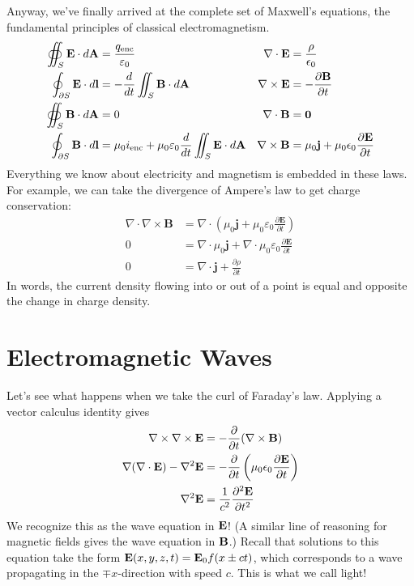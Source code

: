 \documentclass[../p051main.tex]{subfiles}
\begin{document}
Anyway, we've finally arrived at the complete set of Maxwell's equations, the fundamental principles of classical electromagnetism.
\begin{align*}
    \oiint_S \mathbf{E} \cdot d\mathbf{A} &= \frac{q_\text{enc}}{\varepsilon_0} & \nabla \cdot \mathbf{E} &= \frac{\rho}{\epsilon_0} \\
    \oint_{\partial S} \mathbf{E} \cdot d\mathbf{l} &= -\frac{d}{dt} \iint_S \mathbf{B} \cdot d\mathbf{A} & \nabla \times \mathbf{E} &= -\frac{\partial \mathbf{B}}{\partial t} \\
    \oiint_S \mathbf{B} \cdot d\mathbf{A} &= 0 & \nabla \cdot \mathbf{B} &= \mathbf{0} \\
    \oint_{\partial S} \mathbf{B} \cdot d\mathbf{l} &= \mu_0 i_\text{enc} + \mu_0 \varepsilon_0 \frac{d}{dt}\iint_S \mathbf{E} \cdot d\mathbf{A} & \nabla \times \mathbf{B} &= \mu_0 \mathbf{j} + \mu_0 \epsilon_0 \frac{\partial \mathbf{E}}{\partial t}
\end{align*}
Everything we know about electricity and magnetism is embedded in these laws.
For example, we can take the divergence of Ampere's law to get charge conservation:
\begin{align*}
    \nabla \cdot \nabla \times \mathbf{B} &= \nabla \cdot \left( \mu_0 \mathbf{j} + \mu_0 \varepsilon_0 \frac{\partial \mathbf{E}}{\partial t} \right) \\
    0 &= \nabla \cdot \mu_0 \mathbf{j} +  \nabla \cdot \mu_0 \varepsilon_0 \frac{\partial \mathbf{E}}{\partial t} \\
    0 &= \nabla \cdot \mathbf{j} + \frac{\partial \rho}{\partial t}
\end{align*}
In words, the current density flowing into or out of a point is equal and opposite the change in charge density.

\section{Electromagnetic Waves}
Let's see what happens when we take the curl of Faraday's law.
Applying a vector calculus identity gives
\begin{align*}
    \nabla \times \nabla \times \mathbf{E} &= -\frac{\partial}{\partial t} (\nabla \times \mathbf{B}) \\
    \nabla (\nabla \cdot \mathbf{E}) - \nabla^2 \mathbf{E} &= -\frac{\partial}{\partial t} \left( \mu_0 \epsilon_0 \frac{\partial \mathbf{E}}{\partial t} \right) \\
    \nabla^2 \mathbf{E} &= \frac{1}{c^2} \frac{\partial^2 \mathbf{E}}{\partial t^2}
\end{align*}
We recognize this as the wave equation in $\mathbf{E}$!
(A similar line of reasoning for magnetic fields gives the wave equation in $\mathbf{B}$.)
Recall that solutions to this equation take the form $\mathbf{E}(x,y,z,t) = \mathbf{E}_0 f(x \pm ct)$, which corresponds to a wave propagating in the $\mp x$-direction with speed $c$.
This is what we call light!
\end{document}
